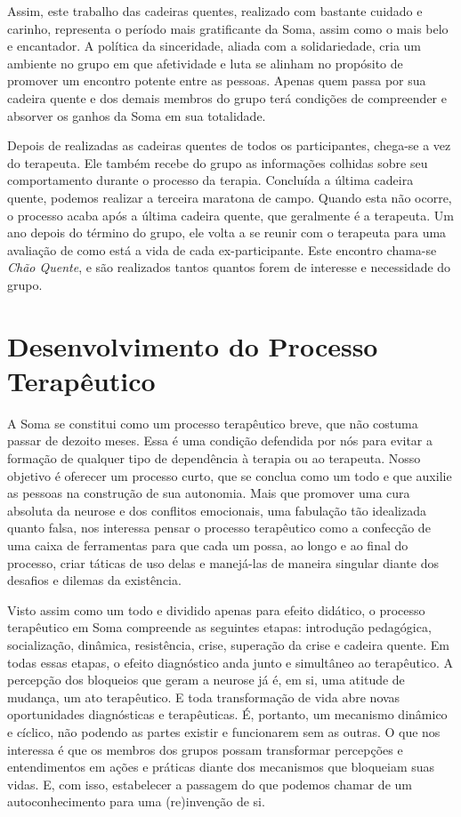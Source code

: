 Assim, este trabalho das cadeiras quentes, realizado com bastante
cuidado e carinho, representa o período mais gratificante da Soma, assim
como o mais belo e encantador. A política da sinceridade, aliada com a
solidariedade, cria um ambiente no grupo em que afetividade e luta se
alinham no propósito de promover um encontro potente entre as pessoas.
Apenas quem passa por sua cadeira quente e dos demais membros do grupo
terá condições de compreender e absorver os ganhos da Soma em sua
totalidade.

Depois de realizadas as cadeiras quentes de todos os participantes,
chega-se a vez do terapeuta. Ele também recebe do grupo as informações
colhidas sobre seu comportamento durante o processo da terapia.
Concluída a última cadeira quente, podemos realizar a terceira maratona
de campo. Quando esta não ocorre, o processo acaba após a última cadeira
quente, que geralmente é a terapeuta. Um ano depois do término do grupo,
ele volta a se reunir com o terapeuta para uma avaliação de como está a
vida de cada ex-participante. Este encontro chama-se \emph{Chão Quente},
e são realizados tantos quantos forem de interesse e necessidade do
grupo.

\section{Desenvolvimento do Processo Terapêutico}

A Soma se constitui como um processo terapêutico breve, que não costuma
passar de dezoito meses. Essa é uma condição defendida por nós para
evitar a formação de qualquer tipo de dependência à terapia ou ao
terapeuta. Nosso objetivo é oferecer um processo curto, que se conclua
como um todo e que auxilie as pessoas na construção de sua autonomia.
Mais que promover uma cura absoluta da neurose e dos conflitos
emocionais, uma fabulação tão idealizada quanto falsa, nos interessa
pensar o processo terapêutico como a confecção de uma caixa de
ferramentas para que cada um possa, ao longo e ao final do processo,
criar táticas de uso delas e manejá-las de maneira singular diante dos
desafios e dilemas da existência.

Visto assim como um todo e dividido apenas para efeito didático, o
processo terapêutico em Soma compreende as seguintes etapas: introdução
pedagógica, socialização, dinâmica, resistência, crise, superação da
crise e cadeira quente. Em todas essas etapas, o efeito diagnóstico anda
junto e simultâneo ao terapêutico. A percepção dos bloqueios que geram a
neurose já é, em si, uma atitude de mudança, um ato terapêutico. E toda
transformação de vida abre novas oportunidades diagnósticas e
terapêuticas. É, portanto, um mecanismo dinâmico e cíclico, não podendo
as partes existir e funcionarem sem as outras. O que nos interessa é que
os membros dos grupos possam transformar percepções e entendimentos em
ações e práticas diante dos mecanismos que bloqueiam suas vidas. E, com
isso, estabelecer a passagem do que podemos chamar de um
autoconhecimento para uma (re)invenção de si.

